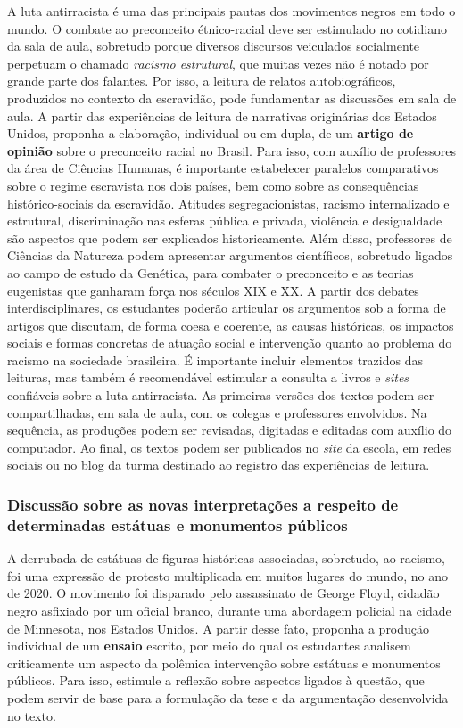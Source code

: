 \documentclass[11pt]{extarticle}
\begin{document}
A luta antirracista é uma das principais pautas dos movimentos negros
em todo o mundo. O combate ao preconceito étnico-racial deve ser
estimulado no cotidiano da sala de aula, sobretudo porque diversos
discursos veiculados socialmente perpetuam o chamado \emph{racismo
estrutural}, que muitas vezes não é notado por grande parte dos
falantes. Por isso, a leitura de relatos autobiográficos, produzidos
no contexto da escravidão, pode fundamentar as discussões em sala de
aula. A partir das experiências de leitura de narrativas originárias
dos Estados Unidos, proponha a elaboração, individual ou em dupla, de
um \textbf{artigo de opinião} sobre o preconceito racial no Brasil.
Para isso, com auxílio de professores da área de Ciências Humanas, é
importante estabelecer paralelos comparativos sobre o regime
escravista nos dois países, bem como sobre as consequências
histórico-sociais da escravidão. Atitudes segregacionistas, racismo
internalizado e estrutural, discriminação nas esferas pública e
privada, violência e desigualdade são aspectos que podem ser
explicados historicamente. Além disso, professores de Ciências da
Natureza podem apresentar argumentos científicos, sobretudo ligados ao
campo de estudo da Genética, para combater o preconceito e as teorias
eugenistas que ganharam força nos séculos XIX e XX. A partir dos
debates interdisciplinares, os estudantes poderão articular os
argumentos sob a forma de artigos que discutam, de forma coesa e
coerente, as causas históricas, os impactos sociais e formas concretas
de atuação social e intervenção quanto ao problema do racismo na
sociedade brasileira. É importante incluir elementos trazidos das
leituras, mas também é recomendável estimular a consulta a livros e
\emph{sites} confiáveis sobre a luta antirracista. As primeiras
versões dos textos podem ser compartilhadas, em sala de aula, com os
colegas e professores envolvidos. Na sequência, as produções podem ser
revisadas, digitadas e editadas com auxílio do computador. Ao final,
os textos podem ser publicados no \emph{site} da escola, em redes
sociais ou no blog da turma destinado ao registro das experiências de
leitura.


\subsubsection{Discussão sobre as novas interpretações 
a respeito de determinadas estátuas e monumentos públicos}

A derrubada de estátuas de figuras históricas associadas, sobretudo,
ao racismo, foi uma expressão de protesto multiplicada em muitos
lugares do mundo, no ano de 2020. O movimento foi disparado pelo
assassinato de George Floyd, cidadão negro asfixiado por um oficial
branco, durante uma abordagem policial na cidade de Minnesota, nos
Estados Unidos. A partir desse fato, proponha a produção individual de
um \textbf{ensaio} escrito, por meio do qual os estudantes analisem
criticamente um aspecto da polêmica intervenção sobre estátuas e
monumentos públicos. Para isso, estimule a reflexão sobre aspectos
ligados à questão, que podem servir de base para a formulação da tese
e da argumentação desenvolvida no texto.
\end{document}
